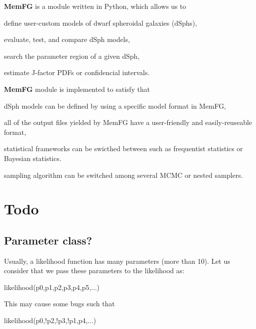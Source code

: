 {\bfseries Mem\+FG} is a module written in Python, which allows us to


\begin{DoxyItemize}
\item define user-\/custom models of dwarf spheroidal galaxies (d\+Sphs),
\item evaluate, test, and compare d\+Sph models,
\item search the parameter region of a given d\+Sph,
\item estimate J-\/factor P\+D\+Fs or confidencial intervals.
\end{DoxyItemize}

{\bfseries Mem\+FG} module is implemented to satisfy that


\begin{DoxyItemize}
\item d\+Sph models can be defined by using a specific model format in Mem\+FG,
\item all of the output files yielded by Mem\+FG have a user-\/friendly and easily-\/reuseable format,
\item statistical frameworks can be swicthed between such as frequentist statistics or Bayesian statistics.
\item sampling algorithm can be switched among several M\+C\+MC or nested samplers.
\end{DoxyItemize}

\section*{Todo}

\subsection*{{\ttfamily Parameter} class?}


\begin{DoxyItemize}
\item Usually, a likelihood function has many parameters (more than 10). Let us consider that we pass these parameters to the likelihood as\+:
\end{DoxyItemize}


\begin{DoxyCode}
likelihood(p0,p1,p2,p3,p4,p5,...)
\end{DoxyCode}


This may cause some bugs such that


\begin{DoxyCode}
likelihood(p0,!p2,!p3,!p1,p4,...)
\end{DoxyCode}


